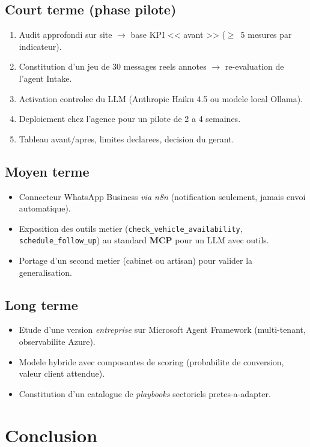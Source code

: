 \documentclass[12pt,a4paper,openany]{report}
\begin{document}
\subsection{Court terme (phase pilote)}
\begin{enumerate}[leftmargin=1.5cm]
\item Audit approfondi sur site $\rightarrow$ base KPI << avant >> ($\geq$~5 mesures par indicateur).
\item Constitution d'un jeu de 30 messages reels annotes $\rightarrow$ re-evaluation de l'agent Intake.
\item Activation controlee du LLM (Anthropic Haiku 4.5 ou modele local Ollama).
\item Deploiement chez l'agence pour un pilote de 2 a 4 semaines.
\item Tableau avant/apres, limites declarees, decision du gerant.
\end{enumerate}

\subsection{Moyen terme}
\begin{itemize}[leftmargin=1.5cm]
\item Connecteur WhatsApp Business \emph{via n8n} (notification seulement, jamais envoi automatique).
\item Exposition des outils metier (\texttt{check\_vehicle\_availability}, \texttt{schedule\_follow\_up}) au standard \textbf{MCP} pour un LLM avec outils.
\item Portage d'un second metier (cabinet ou artisan) pour valider la generalisation.
\end{itemize}

\subsection{Long terme}
\begin{itemize}[leftmargin=1.5cm]
\item Etude d'une version \emph{entreprise} sur Microsoft Agent Framework (multi-tenant, observabilite Azure).
\item Modele hybride avec composantes de scoring (probabilite de conversion, valeur client attendue).
\item Constitution d'un catalogue de \emph{playbooks} sectoriels pretes-a-adapter.
\end{itemize}

\section{Conclusion}
\end{document}
